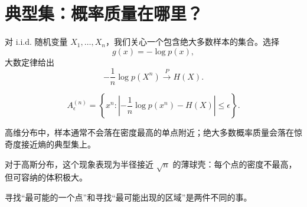 \section{典型集：概率质量在哪里？}

对 i.i.d. 随机变量 $X_1,\ldots,X_n$，我们关心一个包含绝大多数样本的集合。选择
\[
  g(x)=-\log p(x),
\]
大数定律给出
\[
  -\frac{1}{n}\log p(X^n) \xrightarrow{P} H(X).
\]

\begin{definition}[典型集]
\[
 A^{(n)}_\epsilon=\left\{x^n:\left| -\frac1n\log p(x^n)-H(X)\right|\leq\epsilon\right\}.
\]
\end{definition}

\begin{KeyBox}
高维分布中，样本通常不会落在密度最高的单点附近；绝大多数概率质量会落在惊奇度接近熵的典型集上。
\end{KeyBox}

对于高斯分布，这个现象表现为半径接近 $\sqrt n$ 的薄球壳：每个点的密度不最高，但可容纳的体积极大。

\begin{Takeaway}
寻找“最可能的一个点”和寻找“最可能出现的区域”是两件不同的事。
\end{Takeaway}
